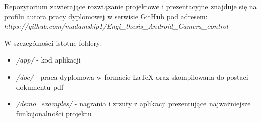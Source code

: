 \newpage
{}


Repozytorium zawierające rozwiązanie projektowe i prezentacyjne znajduje się na profilu autora pracy dyplomowej w serwisie GitHub pod adresem:  \\
\textit{https://github.com/madamskip1/Engi\_thesis\_Android\_Camera\_control}

\vspace{5mm}

W szczególności istotne foldery:

\begin{itemize}
    \item \textit{/app/} - kod aplikacji 
    \item \textit{/doc/} - praca dyplomowa w formacie LaTeX oraz skompilowana do postaci dokumentu pdf
    \item \textit{/demo\_examples/} - nagrania i zrzuty z aplikacji prezentujące najważniejsze funkcjonalności projektu
\end{itemize}